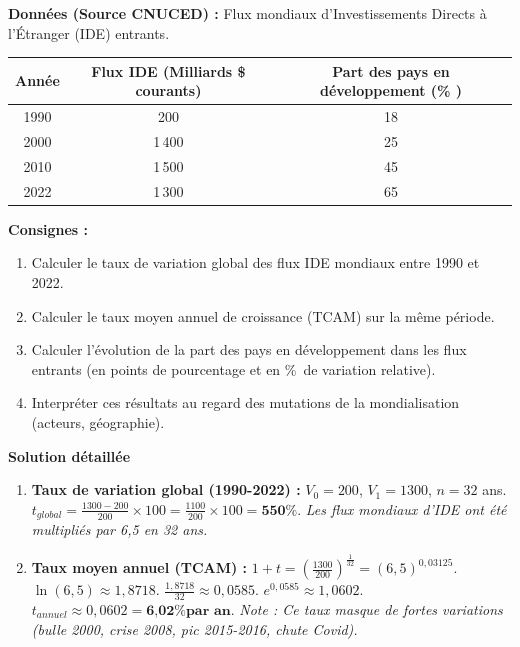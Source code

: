 \documentclass[11pt]{article}
\begin{document}
\begin{exoresolu}
    \textbf{Données (Source CNUCED) :} Flux mondiaux d'Investissements Directs à l'Étranger (IDE) entrants.
    \begin{center}
        \begin{tabular}{|c|c|c|}\hline
        \textbf{Année} & \textbf{Flux IDE (Milliards \$ courants)} & \textbf{Part des pays en développement (\% )} \\ \hline
        1990 & 200 & 18 \\ \hline
        2000 & 1\,400 & 25 \\ \hline
        2010 & 1\,500 & 45 \\ \hline
        2022 & 1\,300 & 65 \\ \hline
        \end{tabular}
    \end{center}
    \textbf{Consignes :}
    \begin{enumerate}
        \item Calculer le taux de variation global des flux IDE mondiaux entre 1990 et 2022.
        \item Calculer le taux moyen annuel de croissance (TCAM) sur la même période.
        \item Calculer l'évolution de la part des pays en développement dans les flux entrants (en points de pourcentage et en \%\ de variation relative).
        \item Interpréter ces résultats au regard des mutations de la mondialisation (acteurs, géographie).
    \end{enumerate}
    \tcblower
    \textbf{Solution détaillée}
    \begin{enumerate}
        \item \textbf{Taux de variation global (1990-2022) :}
            $V_0 = 200$, $V_1 = 1300$, $n = 32$ ans.
            $t_{global} = \frac{1300 - 200}{200} \times 100 = \frac{1100}{200} \times 100 = \textbf{550\%}$.
            \emph{Les flux mondiaux d'IDE ont été multipliés par 6,5 en 32 ans.}
        
        \item \textbf{Taux moyen annuel (TCAM) :}
            $1 + t = \left(\frac{1300}{200}\right)^{\frac{1}{32}} = (6,5)^{0,03125}$.
            $\ln(6,5) \approx 1,8718$. $\frac{1,8718}{32} \approx 0,0585$. $e^{0,0585} \approx 1,0602$.
            $t_{annuel} \approx 0,0602 = \textbf{6,02\% par an}$.
            \emph{Note : Ce taux masque de fortes variations (bulle 2000, crise 2008, pic 2015-2016, chute Covid).}
        

\end{enumerate}
\end{exoresolu}
\end{document}
